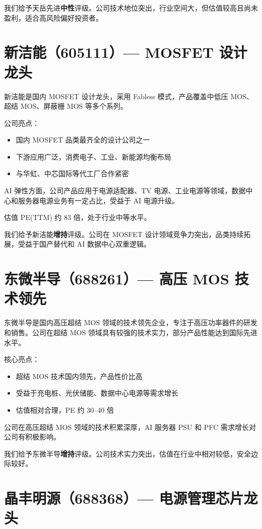 我们给予天岳先进\textbf{中性}评级。公司技术地位突出，行业空间大，但估值较高且尚未盈利，适合高风险偏好投资者。

\section{新洁能（605111）— MOSFET 设计龙头}

新洁能是国内 MOSFET 设计龙头，采用 Fabless 模式，产品覆盖中低压 MOS、超结 MOS、屏蔽栅 MOS 等多个系列。

公司亮点：
\begin{itemize}[leftmargin=2em]
\item 国内 MOSFET 品类最齐全的设计公司之一
\item 下游应用广泛，消费电子、工业、新能源均衡布局
\item 与华虹、中芯国际等代工厂合作紧密
\end{itemize}

AI 弹性方面，公司产品应用于电源适配器、TV 电源、工业电源等领域，数据中心和服务器电源业务有一定占比，受益于 AI 电源升级。

估值 PE(TTM) 约 83 倍，处于行业中等水平。

我们给予新洁能\textbf{增持}评级。公司在 MOSFET 设计领域竞争力突出，品类持续拓展，受益于国产替代和 AI 数据中心双重逻辑。

\section{东微半导（688261）— 高压 MOS 技术领先}

东微半导是国内高压超结 MOS 领域的技术领先企业，专注于高压功率器件的研发和销售。公司在超结 MOS 领域具有较强的技术实力，部分产品性能达到国际先进水平。

核心亮点：
\begin{itemize}[leftmargin=2em]
\item 超结 MOS 技术国内领先，产品性价比高
\item 受益于充电桩、光伏储能、数据中心电源等需求增长
\item 估值相对合理，PE 约 30–40 倍
\end{itemize}

公司在高压超结 MOS 领域的技术积累深厚，AI 服务器 PSU 和 PFC 需求增长对公司有积极影响。

我们给予东微半导\textbf{增持}评级。公司技术实力突出，估值在行业中相对较低，安全边际较好。

\section{晶丰明源（688368）— 电源管理芯片龙头}

